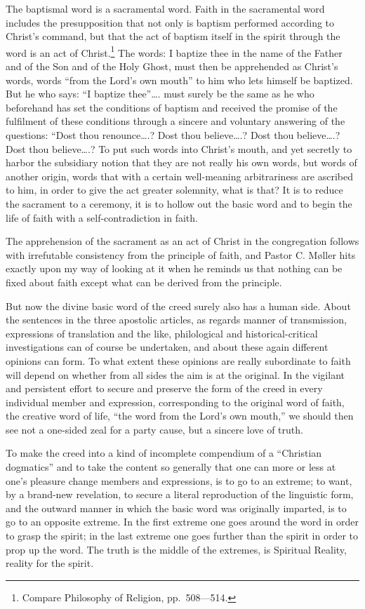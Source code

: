\documentclass[12pt,a4paper,openany]{book}
\newcommand{\opage}[1]{\marginnote{\footnotesize\textit{[#1]}}}
\begin{document}
The baptismal word is a sacramental word. Faith in the sacramental word
includes the presupposition that not only is baptism performed
according to Christ's command, but that the act of baptism itself in
the spirit through the word is an act of Christ.\footnote[2]{Compare Philosophy of Religion, pp.\ 508---514.} The words:
I baptize thee in the name of the Father and of the Son and of the
Holy Ghost, must then be apprehended as Christ's words, words ``from
the Lord's own mouth'' to him who lets himself be baptized. But
he who says: ``I baptize thee''\dots{}. must surely be the
\setcounter{footnote}{0}%
\opage{33}same as he who beforehand has set the conditions of baptism
and received the promise of the fulfilment of these conditions through
a sincere and voluntary answering of the questions:
``Dost thou renounce\dots{}.? Dost thou believe\dots{}.? Dost thou believe\dots{}.?
Dost thou believe\dots{}.? To put such words into Christ's mouth,
and yet secretly to harbor the subsidiary notion that they
are not really his own words, but words of another origin,
words that with a certain well-meaning arbitrariness are ascribed
to him, in order to give the act greater solemnity, what
is that? It is to reduce the sacrament to a ceremony,
it is to hollow out the basic word and to begin the life of faith with
a self-contradiction in faith.

The apprehension of the sacrament as an act of Christ
in the congregation follows with irrefutable consistency
from the principle of faith, and Pastor C. Møller hits exactly
upon my way of looking at it when he reminds us that nothing can be
fixed about faith except what can be derived from the principle.

But now the divine basic word of the creed
surely also has a human side. About the sentences in the
three apostolic articles, as regards manner of transmission,
expressions of translation and the like, philological
and historical-critical investigations can of course be undertaken, and
about these again different opinions can form. To what extent
these opinions are really subordinate to faith will
depend on whether from all sides the aim is at
the original. In the vigilant and persistent effort
to secure and preserve the form of the creed in
every individual member and expression, corresponding to the original
word of faith, the creative word of life, ``the word from the Lord's
own mouth,'' we should then see not a one-sided zeal
for a party cause, but a sincere love of truth.

\setcounter{footnote}{0}%
\opage{34}To make the creed into a kind of incomplete
compendium of a ``Christian dogmatics'' and to take the content
so generally that one can more or less at one's pleasure
change members and expressions, is to go to an
extreme; to want, by a brand-new revelation, to secure
a literal reproduction of the linguistic form, and
the outward manner in which the basic word was originally
imparted, is to go to an opposite extreme. In the
first extreme one goes around the word in order to grasp
the spirit; in the last extreme one goes further than the spirit
in order to prop up the word. The truth is the middle
of the extremes, is Spiritual Reality, reality for the spirit.
\end{document}
